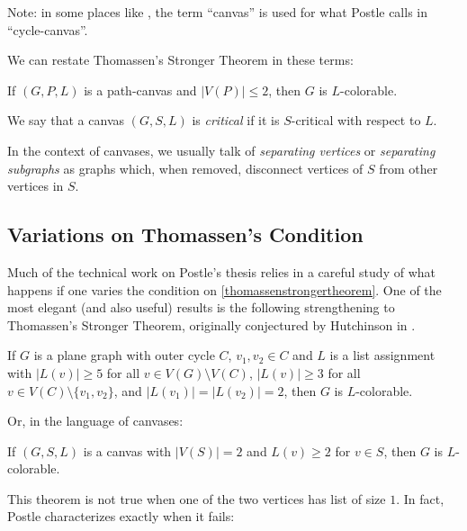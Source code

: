 Note: in some places like \cite{fivelistcoloring2}, the term ``canvas'' is used for what Postle calls in \cite{postlethesis} ``cycle-canvas''.

We can restate Thomassen's Stronger Theorem in these terms:

\begin{theorem}
If $(G, P, L)$ is a path-canvas and $|V(P)| \leq 2$, then $G$ is $L$-colorable.
\end{theorem}

\begin{definition}
We say that a canvas $(G, S, L)$ is \emph{critical} if it is $S$-critical with respect to $L$.
\end{definition}

In the context of canvases, we usually talk of \emph{separating vertices} or \emph{separating
subgraphs} as graphs which, when removed, disconnect vertices of $S$ from other vertices in $S$.



\subsection{Variations on Thomassen's Condition}

Much of the technical work on Postle's thesis relies in a careful study of what happens if one varies the condition on \ref{thomassenstrongertheorem}. One of the most elegant (and also useful) results is the following strengthening to Thomassen's Stronger Theorem, originally conjectured by Hutchinson in \cite{hutchinson2012outerplanar}.

\begin{theorem}
\label{twolistsofsizetwo}
If $G$ is a plane graph with outer cycle $C$, $v_1, v_2 \in C$ and $L$ is a list assignment with $|L(v)| \geq 5$ for all $v \in V(G) \setminus V(C)$, $|L(v)| \geq 3$ for all $v \in V(C) \setminus \{v_1, v_2\}$, and $|L(v_1)| = |L(v_2)| = 2$, then $G$ is $L$-colorable. 
\end{theorem}

Or, in the language of canvases:

\begin{theorem}
If $(G, S, L)$ is a canvas with $|V(S)| = 2$ and $L(v) \geq 2$ for $v \in S$, then $G$ is $L$-colorable.
\end{theorem}

This theorem is not true when one of the two vertices has list of size $1$. In fact, Postle characterizes exactly when it fails:

